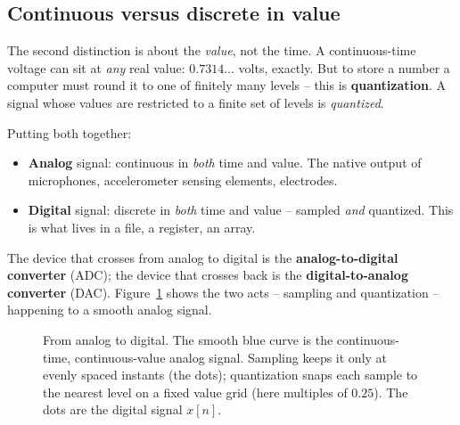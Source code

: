 \subsection*{Continuous versus discrete in value}
The second distinction is about the \emph{value}, not the time. A continuous-time voltage can sit
at \emph{any} real value: $0.7314\ldots$ volts, exactly. But to store a number a computer must
round it to one of finitely many levels -- this is \textbf{quantization}. A signal whose values
are restricted to a finite set of levels is \emph{quantized}.

Putting both together:
\begin{itemize}
\item \textbf{Analog} signal: continuous in \emph{both} time and value. The native output of
microphones, accelerometer sensing elements, electrodes.
\item \textbf{Digital} signal: discrete in \emph{both} time and value -- sampled \emph{and}
quantized. This is what lives in a file, a register, an array.
\end{itemize}
The device that crosses from analog to digital is the \textbf{analog-to-digital converter}
(ADC); the device that crosses back is the \textbf{digital-to-analog converter} (DAC).
Figure~\ref{ch01:fig-sampling} shows the two acts -- sampling and quantization -- happening to a
smooth analog signal.

\begin{figure}[H]
\centering
{}
\caption{From analog to digital. The smooth blue curve is the continuous-time, continuous-value
analog signal. Sampling keeps it only at evenly spaced instants (the dots); quantization snaps
each sample to the nearest level on a fixed value grid (here multiples of $0.25$). The dots are
the digital signal $x[n]$.}
\label{ch01:fig-sampling}
\end{figure}

